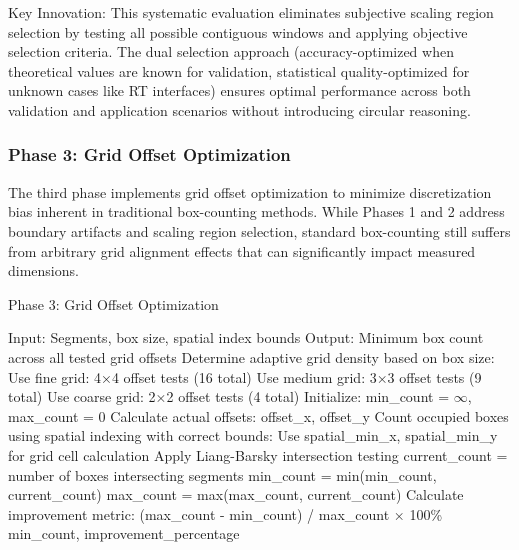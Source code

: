 \documentclass[preprint,12pt]{elsarticle}
\def\textbf#1{#1}%
\begin{document}
\textbf{Key Innovation}: This systematic evaluation eliminates subjective scaling region selection by testing all possible contiguous windows and applying objective selection criteria. The dual selection approach (accuracy-optimized when theoretical values are known for validation, statistical quality-optimized for unknown cases like RT interfaces) ensures optimal performance across both validation and application scenarios without introducing circular reasoning.

\subsubsection{Phase 3: Grid Offset Optimization}

The third phase implements grid offset optimization to minimize discretization bias inherent in traditional box-counting methods. While Phases 1 and 2 address boundary artifacts and scaling region selection, standard box-counting still suffers from arbitrary grid alignment effects that can significantly impact measured dimensions.

\begin{algorithm}[H]
\caption{Phase 3: Grid Offset Optimization}
\begin{algorithmic}[1]
\small
\State \textbf{Input:} Segments, box size, spatial index bounds
\State \textbf{Output:} Minimum box count across all tested grid offsets
\State
\State Determine adaptive grid density based on box size:
    \State Use fine grid: 4×4 offset tests (16 total)
    \State Use medium grid: 3×3 offset tests (9 total)
\Else
    \State Use coarse grid: 2×2 offset tests (4 total)
\EndIf
\State
\State Initialize: min\_count = $\infty$, max\_count = 0
    \State Calculate actual offsets: offset\_x, offset\_y
    \State Count occupied boxes using spatial indexing with correct bounds:
    \State \hspace{1em} Use spatial\_min\_x, spatial\_min\_y for grid cell calculation
    \State \hspace{1em} Apply Liang-Barsky intersection testing
    \State current\_count = number of boxes intersecting segments
    \State min\_count = min(min\_count, current\_count)
    \State max\_count = max(max\_count, current\_count)
\EndFor
\State
\State Calculate improvement metric: (max\_count - min\_count) / max\_count × 100\%
\State \Return min\_count, improvement\_percentage
\end{algorithmic}
\end{algorithm}
\end{document}

